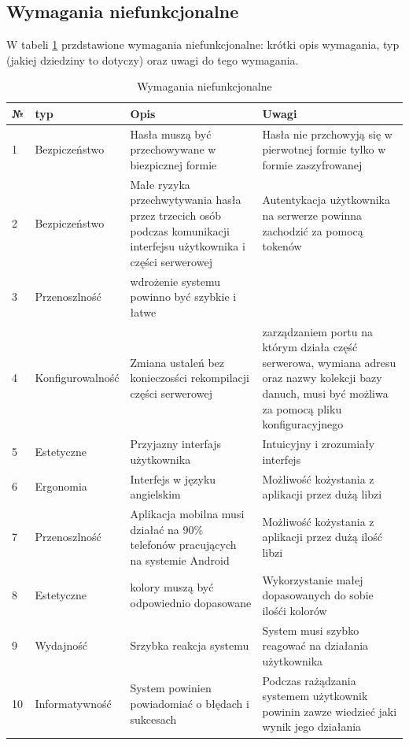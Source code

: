 \subsection{Wymagania niefunkcjonalne}
W tabeli \ref{tab:wymaganianiefunkcjonalne} przdstawione wymagania niefunkcjonalne: krótki opis wymagania, typ (jakiej dziedziny to dotyczy) oraz uwagi do tego wymagania.
\begin{table}[htb] \small
    \caption{Wymagania niefunkcjonalne}
    \label{tab:wymaganianiefunkcjonalne}
    \begin{tabular}{| m{0.5cm} | m{3cm} | m{5.75cm} | m{5.75cm} |} 
    \hline
    № & typ & Opis & Uwagi \\
    \hline
    1 & Bezpiczeństwo & Hasła muszą być przechowywane w biezpicznej formie & Hasła nie przchowyją się w pierwotnej formie tylko w formie zaszyfrowanej \\ 
    \hline
    2 & Bezpiczeństwo & Małe ryzyka przechwytywania hasła przez trzecich osób podczas komunikacji interfejsu użytkownika i części serwerowej & Autentykacja użytkownika na serwerze powinna zachodzić za pomocą tokenów \\ 
    \hline
    3 & Przenoszlność & wdrożenie systemu powinno być szybkie i łatwe & \\ 
    \hline
    4 & Konfigurowalność & Zmiana ustaleń bez konieczosści rekompilacji części serwerowej & zarządzaniem portu na którym działa część serwerowa, wymiana adresu oraz nazwy kolekcji bazy danuch, musi być możliwa za pomocą pliku konfiguracyjnego \\ 
    \hline
    5 & Estetyczne & Przyjazny interfajs użytkownika & Intuicyjny i zrozumiały interfejs \\ 
    \hline
    6 & Ergonomia & Interfejs w języku angielskim & Możliwość kożystania z aplikacji przez dużą libzi \\
    \hline
    7 & Przenoszlność & Aplikacja mobilna musi działać na 90\% telefonów pracujących na systemie Android & Możliwość kożystania z aplikacji przez dużą ilość libzi \\
    \hline
    8 & Estetyczne & kolory muszą być odpowiednio dopasowane & Wykorzystanie małej dopasowanych do sobie ilośći kolorów  \\
    \hline
    9 & Wydajność & Srzybka reakcja systemu & System musi szybko reagować na działania użytkownika \\
    \hline
    10 & Informatywność & System powinien powiadomiać o błędach i sukcesach  & Podczas rażądzania systemem użytkownik powinin zawze wiedzieć jaki wynik jego działania \\

\end{tabular}
\end{table}
